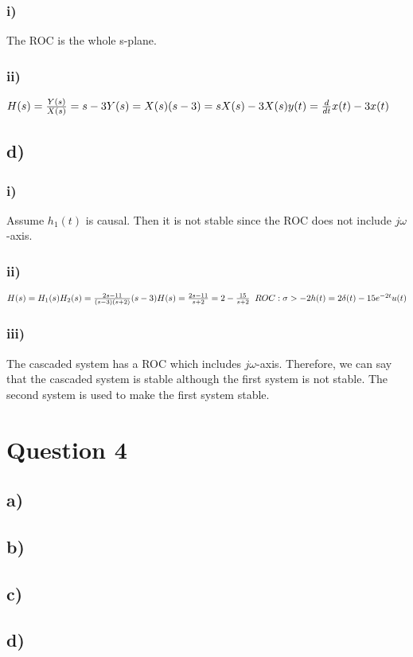 \documentclass[12pt]{article}
\begin{document}
    \subsubsection*{i)}    
    The ROC is the whole s-plane.   
    
    \subsubsection*{ii)}
    \begin{math}
        H(s) = \frac{Y(s)}{X(s)} = s-3\\
        Y(s) = X(s)(s-3) = sX(s) -3X(s)\\
        y(t) = \frac{d}{dt}x(t) - 3x(t)
    \end{math}
    
    \subsection*{d)}
    \subsubsection*{i)}       
    Assume \(h_1(t)\) is causal. Then it is not stable since the ROC does not include \(j\omega\)-axis.
    \subsubsection*{ii)}
    \begin{math}
        H(s) = H_1(s)H_2(s) = \frac{2s-11}{(s-3)(s+2)}(s-3)
        H(s) = \frac{2s-11}{s+2} = 2 - \frac{15}{s+2} \;\; ROC: \sigma > -2 \\
        h(t) = 2\delta(t) - 15e^{-2t}u(t)
    \end{math}
    \subsubsection*{iii)}
    The cascaded system has a ROC which includes \(j\omega\)-axis. Therefore, we can say that the cascaded 
    system is stable although the first system is not stable. The second system is used to make the first 
    system stable.
       
    \section*{Question 4}
    \subsection*{a)}
    
     \subsection*{b)}
    
     \subsection*{c)}
    
     \subsection*{d)}     
    
\end{document}
